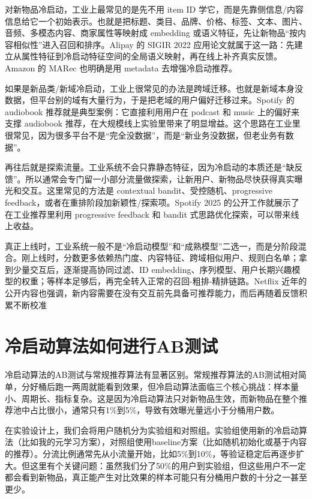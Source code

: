 \documentclass[UTF8]{ctexart}
\begin{document}
对新物品冷启动，工业上最常见的是先不用 item ID 学它，而是先靠侧信息/内容信息给它一个初始表示。也就是把标题、类目、品牌、价格、标签、文本、图片、音频、多模态内容、商家属性等映射成 embedding 或语义特征，先让新物品“按内容相似性”进入召回和排序。Alipay 的 SIGIR 2022 应用论文就属于这一路：先建立从属性特征到冷启动特征空间的全局语义映射，再在线上补齐真实反馈。Amazon 的 MARec 也明确是用 metadata 去增强冷启动推荐。

如果是新品类/新域冷启动，工业上很常见的办法是跨域迁移。也就是新域本身没数据，但平台别的域有大量行为，于是把老域的用户偏好迁移过来。Spotify 的 audiobook 推荐就是典型案例：它直接利用用户在 podcast 和 music 上的偏好来支撑 audiobook 推荐，在大规模线上实验里带来了明显增益。这个思路在工业里很常见，因为很多平台不是“完全没数据”，而是“新业务没数据，但老业务有数据”。

再往后就是探索流量。工业系统不会只靠静态特征，因为冷启动的本质还是“缺反馈”。所以通常会专门留一小部分流量做探索，让新用户、新物品尽快获得真实曝光和交互。这里常见的方法是 contextual bandit、受控随机、progressive feedback，或者在重排阶段加新颖性/探索项。Spotify 2025 的公开工作就展示了在工业推荐里利用 progressive feedback 和 bandit 式思路优化探索，可以带来线上收益。

真正上线时，工业系统一般不是“冷启动模型”和“成熟模型”二选一，而是分阶段混合。刚上线时，分数更多依赖热门度、内容特征、跨域相似用户、规则白名单；拿到少量交互后，逐渐提高协同过滤、ID embedding、序列模型、用户长期兴趣模型的权重；等样本足够后，再完全转入正常的召回-粗排-精排链路。Netflix 近年的公开内容也强调，新内容需要在没有交互前先具备可推荐能力，而后再随着反馈积累不断校准



\section{冷启动算法如何进行AB测试}

冷启动算法的AB测试与常规推荐算法有显著区别。常规推荐算法的AB测试相对简单，分好桶后跑一两周就能看到效果，但冷启动算法面临三个核心挑战：样本量小、周期长、指标复杂。这是因为冷启动算法只对新物品生效，而新物品在整个推荐池中占比很小，通常只有1\%到5\%，导致有效曝光量远小于分桶用户数。

在实验设计上，我们会将用户随机分为实验组和对照组。实验组使用新的冷启动算法（比如我的元学习方案），对照组使用baseline方案（比如随机初始化或基于内容的推荐）。分流比例通常先从小流量开始，比如5\%到10\%，等验证稳定后再逐步扩大。但这里有个关键问题：虽然我们分了50\%的用户到实验组，但这些用户不一定都会看到新物品，真正能产生对比效果的样本可能只有分桶用户数的十分之一甚至更少。
\end{document}
